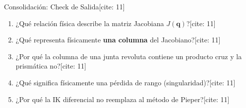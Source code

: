 \documentclass[aspectratio=169, xcolor={table,xcdraw}]{beamer}
\begin{document}
\begin{frame}{Consolidación: Check de Salida[cite: 11]}
    \begin{tcolorbox}[colback=white, colframe=ucbblue, title=Cierre Conceptual]
        \begin{enumerate}
            \item ¿Qué relación física describe la matriz Jacobiana $J(\mathbf{q})$?[cite: 11]
            \item ¿Qué representa físicamente \textbf{una columna} del Jacobiano?[cite: 11]
            \item ¿Por qué la columna de una junta revoluta contiene un producto cruz y la prismática no?[cite: 11]
            \item ¿Qué significa físicamente una pérdida de rango (singularidad)?[cite: 11]
            \item ¿Por qué la IK diferencial no reemplaza al método de Pieper?[cite: 11]
        \end{enumerate}
    \end{tcolorbox}
\end{frame}
\end{document}
